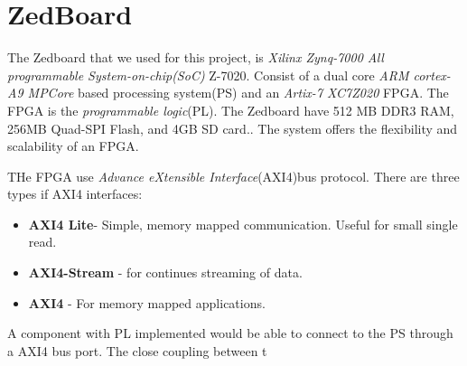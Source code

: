 \section{ZedBoard}
The Zedboard that we used for this project, is \textit{Xilinx Zynq-7000 All programmable System-on-chip(SoC)} Z-7020. Consist of a dual core \textit{ARM cortex-A9 MPCore} based processing system(PS) and an \textit{Artix-7 XC7Z020} FPGA. The FPGA is the \textit{programmable logic}(PL). The Zedboard have 512 MB DDR3 RAM, 256MB Quad-SPI Flash, and 4GB SD card.\cite{FPGASoCManual}. The system offers the flexibility and scalability of an FPGA\citep{FPGAOVERVIEW}. 

THe FPGA use \textit{Advance eXtensible Interface}(AXI4)bus protocol. There are three types if AXI4 interfaces:
\begin{itemize}
\item \textbf{AXI4 Lite}- Simple, memory mapped communication. Useful for small single read.
\item \textbf{AXI4-Stream} - for continues streaming of data.
\item \textbf{AXI4} - For memory mapped applications.
\end{itemize} 

A component with PL implemented would be able to connect to the PS through a AXI4 bus port. The close coupling between t


